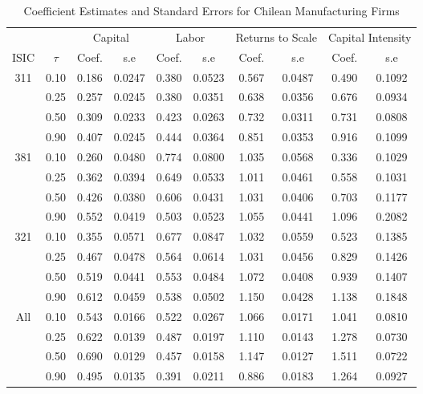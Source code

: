 \begin{table}[ht]
\centering
\caption{Coefficient Estimates and Standard Errors for Chilean Manufacturing Firms} 
\begin{tabular}{cccccccccc}
  \hline\hline & & \multicolumn{2}{c}{Capital}  & \multicolumn{2}{c}{Labor} & \multicolumn{2}{c}{Returns to Scale} & \multicolumn{2}{c}{Capital Intensity}\\ \cmidrule(lr){3-4} \cmidrule(lr){5-6} \cmidrule(lr){7-8} \cmidrule(lr){9-10}ISIC & $\tau$ & Coef. & s.e & Coef. & s.e & Coef. & s.e & Coef. & s.e \\ 
  \hline
311 & 0.10 & 0.186 & 0.0247 & 0.380 & 0.0523 & 0.567 & 0.0487 & 0.490 & 0.1092 \\ 
   & 0.25 & 0.257 & 0.0245 & 0.380 & 0.0351 & 0.638 & 0.0356 & 0.676 & 0.0934 \\ 
   & 0.50 & 0.309 & 0.0233 & 0.423 & 0.0263 & 0.732 & 0.0311 & 0.731 & 0.0808 \\ 
   & 0.90 & 0.407 & 0.0245 & 0.444 & 0.0364 & 0.851 & 0.0353 & 0.916 & 0.1099 \\ 
  381 & 0.10 & 0.260 & 0.0480 & 0.774 & 0.0800 & 1.035 & 0.0568 & 0.336 & 0.1029 \\ 
   & 0.25 & 0.362 & 0.0394 & 0.649 & 0.0533 & 1.011 & 0.0461 & 0.558 & 0.1031 \\ 
   & 0.50 & 0.426 & 0.0380 & 0.606 & 0.0431 & 1.031 & 0.0406 & 0.703 & 0.1177 \\ 
   & 0.90 & 0.552 & 0.0419 & 0.503 & 0.0523 & 1.055 & 0.0441 & 1.096 & 0.2082 \\ 
  321 & 0.10 & 0.355 & 0.0571 & 0.677 & 0.0847 & 1.032 & 0.0559 & 0.523 & 0.1385 \\ 
   & 0.25 & 0.467 & 0.0478 & 0.564 & 0.0614 & 1.031 & 0.0456 & 0.829 & 0.1426 \\ 
   & 0.50 & 0.519 & 0.0441 & 0.553 & 0.0484 & 1.072 & 0.0408 & 0.939 & 0.1407 \\ 
   & 0.90 & 0.612 & 0.0459 & 0.538 & 0.0502 & 1.150 & 0.0428 & 1.138 & 0.1848 \\ 
  All & 0.10 & 0.543 & 0.0166 & 0.522 & 0.0267 & 1.066 & 0.0171 & 1.041 & 0.0810 \\ 
   & 0.25 & 0.622 & 0.0139 & 0.487 & 0.0197 & 1.110 & 0.0143 & 1.278 & 0.0730 \\ 
   & 0.50 & 0.690 & 0.0129 & 0.457 & 0.0158 & 1.147 & 0.0127 & 1.511 & 0.0722 \\ 
   & 0.90 & 0.495 & 0.0135 & 0.391 & 0.0211 & 0.886 & 0.0183 & 1.264 & 0.0927 \\ 
   \hline
\end{tabular}
\end{table}
